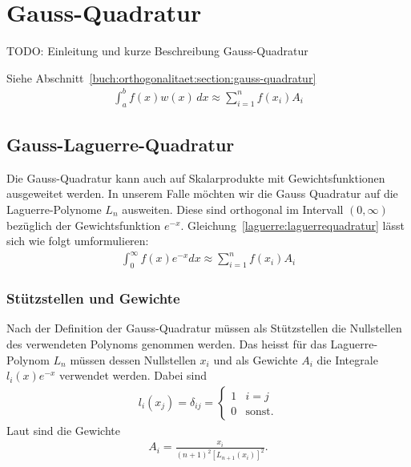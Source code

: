 %
%
%
\section{Gauss-Quadratur
  \label{laguerre:section:quadratur}}
 {\large \color{red} TODO: Einleitung und kurze Beschreibung Gauss-Quadratur}
 
Siehe Abschnitt~\ref{buch:orthogonalitaet:section:gauss-quadratur}
\begin{align}
\int_a^b f(x) w(x) \, dx
\approx
\sum_{i=1}^n f(x_i) A_i
\label{laguerre:gaussquadratur}
\end{align}

\subsection{Gauss-Laguerre-Quadratur
\label{laguerre:subsection:gausslag-quadratur}}
Die Gauss-Quadratur kann auch auf Skalarprodukte mit Gewichtsfunktionen
ausgeweitet werden.
In unserem Falle möchten wir die Gauss Quadratur auf die Laguerre-Polynome
$L_n$ ausweiten.
Diese sind orthogonal im Intervall $(0, \infty)$ bezüglich
der Gewichtsfunktion $e^{-x}$.
Gleichung~\eqref{laguerre:laguerrequadratur} lässt sich wie folgt umformulieren:
\begin{align}
\int_{0}^{\infty} f(x) e^{-x} dx
\approx
\sum_{i=1}^{n} f(x_i) A_i
\label{laguerre:laguerrequadratur}
\end{align}

\subsubsection{Stützstellen und Gewichte}
Nach der Definition der Gauss-Quadratur müssen als Stützstellen die Nullstellen
des verwendeten Polynoms genommen werden.
Das heisst für das Laguerre-Polynom $L_n$ müssen dessen Nullstellen $x_i$ und
als Gewichte $A_i$ die Integrale $l_i(x)e^{-x}$ verwendet werden.
Dabei sind
\begin{align*}
l_i(x_j)
=
\delta_{ij}
=
\begin{cases}
1 & i=j           \\
0 & \text{sonst.}
\end{cases}
\end{align*}
Laut \cite{abramowitz+stegun} sind die Gewichte
\begin{align}
A_i
=
\frac{x_i}{(n + 1)^2 \left[ L_{n + 1}(x_i)\right]^2}
.
\label{laguerre:quadratur_gewichte}
\end{align}


